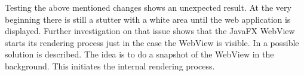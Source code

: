 Testing the above mentioned changes shows an unexpected result. 
At the very beginning there is still a stutter with a white area until the web application is displayed. 
Further investigation on that issue shows that the JavaFX WebView starts its rendering process just in the case the WebView is visible. 
In \autocite{impl:fx-snapshot} a possible solution is described. 
The idea is to do a snapshot of the WebView in the background. 
This initiates the internal rendering process. 
